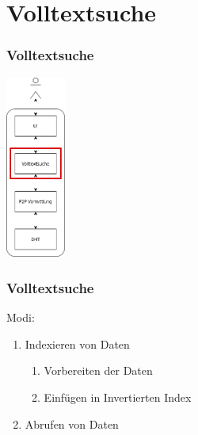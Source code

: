\documentclass{beamer}
\begin{document}
\section{Volltextsuche}
\begin{frame}
  \frametitle{Volltextsuche}

  \begin{center}
    \includegraphics[height=6cm]{Schichten-alt-volltext}
  \end{center}
\end{frame}

\begin{frame}
  \frametitle{Volltextsuche}

  Modi:
  \begin{enumerate}
    \item Indexieren von Daten
      \begin{enumerate}[a]
        \item Vorbereiten der Daten
        \item Einfügen in Invertierten Index
      \end{enumerate}
    \item Abrufen von Daten
  \end{enumerate}
\end{frame}
\end{document}
